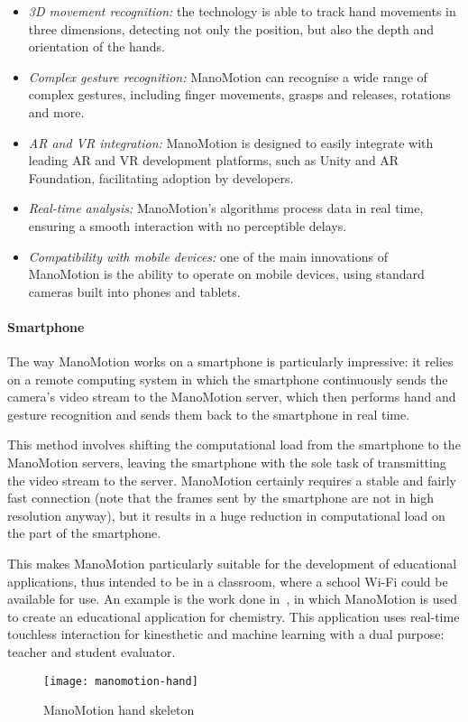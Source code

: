 \begin{itemize}
	\item \textit{3D movement recognition:} the technology is able to track hand movements in three dimensions,
	detecting not only the position, but also the depth and orientation of the hands.
	\item \textit{Complex gesture recognition:} ManoMotion can recognise a wide range of complex gestures,
	including finger movements, grasps and releases, rotations and more.
	\item \textit{AR and VR integration:} ManoMotion is designed to easily integrate with leading AR and VR development
	platforms, such as Unity and AR Foundation, facilitating adoption by developers.
	\item \textit{Real-time analysis:} ManoMotion's algorithms process data in real time,
	ensuring a smooth interaction with no perceptible delays.
	\item \textit{Compatibility with mobile devices:} one of the main innovations of ManoMotion is the ability
	to operate on mobile devices, using standard cameras built into phones and tablets.
\end{itemize}

\paragraph{Smartphone}
The way ManoMotion works on a smartphone is particularly impressive: it relies on a remote computing system
in which the smartphone continuously sends the camera's video stream to the ManoMotion server,
which then performs hand and gesture recognition and sends them back to the smartphone in real time.

This method involves shifting the computational load from the smartphone to the ManoMotion servers,
leaving the smartphone with the sole task of transmitting the video stream to the server.
ManoMotion certainly requires a stable and fairly fast connection
(note that the frames sent by the smartphone are not in high resolution anyway),
but it results in a huge reduction in computational load on the part of the smartphone.

This makes ManoMotion particularly suitable for the development of educational applications,
thus intended to be in a classroom, where a school Wi-Fi could be available for use.
An example is the work done in~\cite{manomotion-agilest},
in which ManoMotion is used to create an educational application for chemistry.
This application uses real-time touchless interaction for
kinesthetic and machine learning with a dual purpose: teacher and student evaluator.

\begin{figure}[ht]
	\centering
	\texttt{[image: manomotion-hand]}
	\caption{ManoMotion hand skeleton}
	\label{fig:manomotion}
\end{figure}
